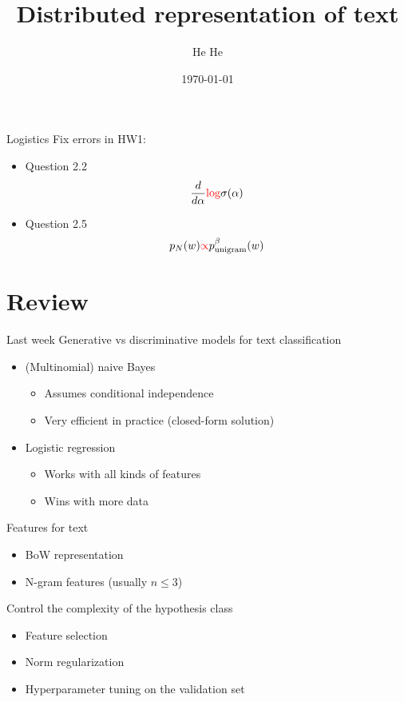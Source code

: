 \documentclass[usenames,dvipsnames,notes]{beamer}
\title[CSCI-GA.2590]{Distributed representation of text}
\author[He He]{He He
}
\institute[NYU]{New York University}
\date{\today}
\begin{document}
\begin{frame}
\titlepage
\end{frame}

\begin{frame}
    {Logistics}
    Fix errors in HW1:\\
    \begin{itemize}
        \item Question 2.2
            $$
            \frac{d}{d\alpha}{\color{red}\log}\sigma(\alpha)
            $$
        \item Question 2.5
            $$
            p_N(w) {\color{red}\propto} p_{\text{unigram}}^\beta(w)
            $$
    \end{itemize}
\end{frame}

\section{Review}
\begin{frame}
    {Last week}
    Generative vs discriminative models for text classification\\
    \begin{itemize}
        \item (Multinomial) naive Bayes
            \begin{itemize}
                \item Assumes conditional independence
                \item Very efficient in practice (closed-form solution)
            \end{itemize}
        \item Logistic regression
            \begin{itemize}
                \item Works with all kinds of features
                \item Wins with more data
            \end{itemize}
    \end{itemize}

    Features for text\\
    \begin{itemize}
        \item BoW representation
        \item N-gram features (usually $n\le 3$)
    \end{itemize}

    Control the complexity of the hypothesis class\\
    \begin{itemize}
        \item Feature selection
        \item Norm regularization
        \item Hyperparameter tuning on the validation set
    \end{itemize}
\end{frame}
\end{document}
